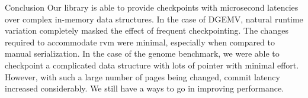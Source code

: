 \begin{block}{Conclusion}
    Our library is able to provide checkpoints with microsecond latencies over
    complex in-memory data structures. In the case of DGEMV, natural runtime
    variation completely masked the effect of frequent checkpointing. The
    changes required to accommodate rvm were minimal, especially when compared
    to manual serialization. In the case of the genome benchmark, we were
    able to checkpoint a complicated data structure with lots of pointer with
    minimal effort. However, with such a large number of pages being changed,
    commit latency increased considerably. We still have a ways to go in
    improving performance.
\end{block}
